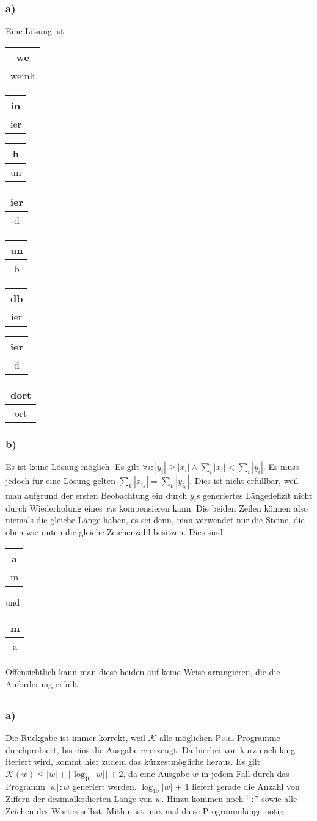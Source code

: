 \documentclass{article}
\begin{document}
\subsubsection{a)}

\newcommand{\tile}[2]{
      \begin{tabular}{|c|}
         \hline
         \cellcolor{lightgray!10} #1 \\ \hline
         \cellcolor{lightgray!10} #2 \\
         \hline
      \end{tabular}
}

Eine Lösung ist

\vspace{\baselineskip}

\tile{we}{weinh}\tile{in}{ier}\tile{h}{un}\tile{ier}{d}\tile{un}{b}\tile{db}{ier}\tile{ier}{d}\tile{dort}{ort}

\subsubsection{b)}

Es ist keine Lösung möglich. Es gilt $\forall i: |y_i| \ge |x_i| \wedge \sum_i
|x_i| < \sum_i |y_i|$. Es muss jedoch für eine Lösung gelten $\sum_k |x_{i_k}| =
\sum_k |y_{i_k}|$. Dies ist nicht erfüllbar, weil man aufgrund der ersten
Beobachtung ein durch $y_i$s generiertes Längedefizit nicht durch Wiederholung
eines $x_i$s kompensieren kann. Die beiden Zeilen können also niemals die
gleiche Länge haben, es sei denn, man verwendet nur die Steine, die oben wie
unten die gleiche Zeichenzahl besitzen. Dies sind 

\vspace{\baselineskip}
\begin{center}
   \tile{a}{m} und \tile{m}{a}
\end{center}
\vspace{\baselineskip}

Offensichtlich kann man diese beiden auf keine Weise arrangieren, die die
Anforderung erfüllt.

\subsection{} 

\subsubsection{a)}

Die Rückgabe ist immer korrekt, weil $\mathcal{K}$ alle möglichen
\textsc{Purl}-Programme durchprobiert, bis eins die Ausgabe $w$ erzeugt. Da
hierbei von kurz nach lang iteriert wird, kommt hier zudem das kürzestmögliche
heraus. Es gilt $\mathcal{K}(w) \le |w| + \lfloor\log_{10}|w|\rfloor + 2$, da eine
Ausgabe $w$ in jedem Fall durch das Programm $|w|$\texttt{:}$w$ generiert
werden. $\log_{10}|w|$ + 1 liefert gerade die Anzahl von Ziffern der
dezimalkodierten Länge von $w$. Hinzu kommen noch ``\texttt{:}'' sowie alle
Zeichen des Wortes selbst. Mithin ist maximal diese Programmlänge nötig.
\end{document}
